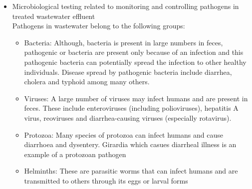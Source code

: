 \begin{itemize}
\item Microbiological testing related to monitoring and controlling pathogens in treated wastewater effluent\\

	
				Pathogens in wastewater belong to the following groups:
				\begin{itemize}
					\item Bacteria:  Although, bacteria is present in large numbers in feces, pathogenic or bacteria are present only because of an infection and this pathogenic bacteria can potentially spread the infection to other healthy individuals.  Disease spread by pathogenic bacteria include diarrhea, cholera and typhoid among many others.
					      
					\item Viruses: A large number of viruses may infect humans and are present in feces.  These include enteroviruses (including polioviruses), hepatitis A virus, reoviruses and diarrhea-causing viruses (especially rotavirus).
					      
					\item Protozoa:  Many species of protozoa can infect humans and cause diarrhoea and dysentery. Girardia which casues diarrheal illness is an example of a protozoan pathogen
					      
					\item Helminths:  These are parasitic worms that can infect humans and are transmitted to others through its eggs or larval forms
					      
				\end{itemize}
				

\end{itemize}
